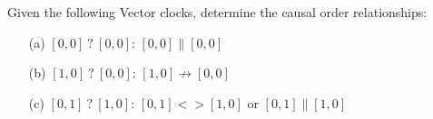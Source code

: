 \begin{Answer} Given the following Vector clocks, determine the causal order relationships:

    \begin{itemize}
        \item[(a)] $[0,0]\ ?\ [0,0]$: $[0,0] \parallel [0,0]$
        \item[(b)] $[1,0]\ ?\ [0,0]$: $[1,0] \not\rightarrow [0,0]$
        \item[(c)] $[0,1]\ ?\ [1,0]$: $[0,1] <> [1,0]$ or $[0,1] \parallel [1,0]$
    \end{itemize}
\end{Answer}